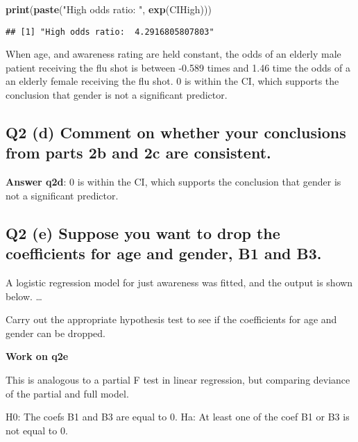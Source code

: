 \documentclass[
]{article}
\newenvironment{Shaded}{\begin{snugshade}}{\end{snugshade}}
\newcommand{\KeywordTok}[1]{\textcolor[rgb]{0.13,0.29,0.53}{\textbf{#1}}}
\newcommand{\NormalTok}[1]{#1}
\newcommand{\StringTok}[1]{\textcolor[rgb]{0.31,0.60,0.02}{#1}}
\begin{document}
\begin{Shaded}
\begin{Highlighting}[]
\KeywordTok{print}\NormalTok{(}\KeywordTok{paste}\NormalTok{(}\StringTok{"High odds ratio: "}\NormalTok{, }\KeywordTok{exp}\NormalTok{(CIHigh)))}
\end{Highlighting}
\end{Shaded}

\begin{verbatim}
## [1] "High odds ratio:  4.2916805807803"
\end{verbatim}

When age, and awareness rating are held constant, the odds of an elderly
male patient receiving the flu shot is between -0.589 times and 1.46
time the odds of a an elderly female receiving the flu shot. 0 is within
the CI, which supports the conclusion that gender is not a significant
predictor.

\hypertarget{q2-d-comment-on-whether-your-conclusions-from-parts-2b-and-2c-are-consistent.}{%
\subsection{Q2 (d) Comment on whether your conclusions from parts 2b and
2c are
consistent.}\label{q2-d-comment-on-whether-your-conclusions-from-parts-2b-and-2c-are-consistent.}}

\textbf{Answer q2d}: 0 is within the CI, which supports the conclusion
that gender is not a significant predictor.

\hypertarget{q2-e-suppose-you-want-to-drop-the-coefficients-for-age-and-gender-b1-and-b3.}{%
\subsection{Q2 (e) Suppose you want to drop the coefficients for age and
gender, B1 and
B3.}\label{q2-e-suppose-you-want-to-drop-the-coefficients-for-age-and-gender-b1-and-b3.}}

A logistic regression model for just awareness was fitted, and the
output is shown below. \ldots{}

Carry out the appropriate hypothesis test to see if the coefficients for
age and gender can be dropped.

\textbf{Work on q2e}

This is analogous to a partial F test in linear regression, but
comparing deviance of the partial and full model.

H0: The coefs B1 and B3 are equal to 0. Ha: At least one of the coef B1
or B3 is not equal to 0.
\end{document}
